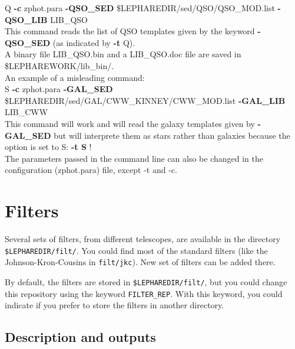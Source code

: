 \documentclass[12pt]{article}
\begin{document}
 Q {\bf -c} zphot.para {\bf -QSO\_SED}  \$LEPHAREDIR/sed/QSO/QSO\_MOD.list {\bf -QSO\_LIB}   LIB\_QSO \\
%
This command reads the list of QSO templates given by the keyword  {\bf -QSO\_SED}  (as indicated by {\bf -t} Q). \\
A binary file  LIB\_QSO.bin and a  LIB\_QSO.doc file are saved in \$LEPHAREWORK/lib\_bin/. \\

An example of a misleading command:\\
 S {\bf -c} zphot.para {\bf -GAL\_SED}  \$LEPHAREDIR/sed/GAL/CWW\_KINNEY/CWW\_MOD.list   {\bf -GAL\_LIB}   LIB\_CWW \\
%
This command will work and will read the galaxy templates given by  {\bf -GAL\_SED} but will interprete them as stars rather than galaxies because the option is set to S: {\bf -t  S} !
 \\


The parameters passed in the command line can also be changed in the configuration (zphot.para) file, except -t and -c.
 \newpage
%


\section{Filters }
\label{sec:filter}
%

Several sets of filters, from different telescopes, are available in the directory \texttt{\$LEPHAREDIR/filt/}. You could find most of the standard filters (like the Johnson-Kron-Cousins in \texttt{filt/jkc}). New set of filters can be added there.

By default, the filters are stored in \texttt{\$LEPHAREDIR/filt/}, but you could change this repository using the keyword \texttt{FILTER\_REP}. With this keyword, you could indicate if you prefer to store the filters in another directory.

\subsection{Description and outputs}
\end{document}
